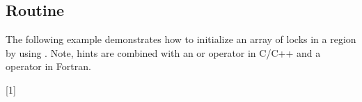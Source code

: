 \subsection{ Routine}
\label{subsec:init_lock_with_hint}

The following example demonstrates how to initialize an array of locks in a  region by using .
Note, hints are combined with an \code{|} or \code{+} operator in C/C++ and a \code{+} operator in Fortran.


[1]

